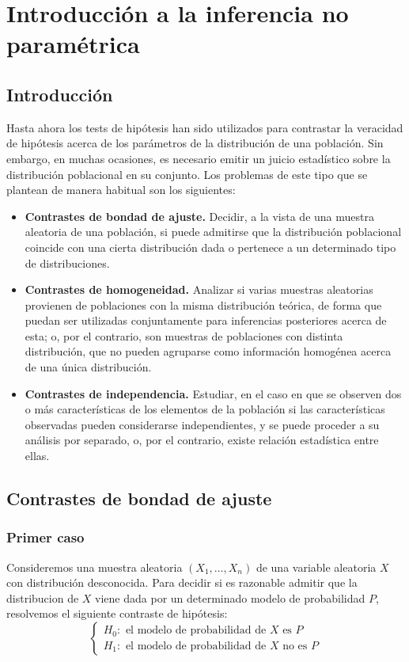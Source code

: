 \chapter{Introducción a la inferencia no paramétrica}
\section{Introducción}
Hasta ahora los tests de hipótesis han sido utilizados para contrastar la veracidad de hipótesis acerca de los parámetros de la distribución de una población.
Sin embargo, en muchas ocasiones, es necesario emitir un juicio estadístico sobre la distribución poblacional en su conjunto.
Los problemas de este tipo que se plantean de manera habitual son los siguientes:
\begin{itemize}
    \item \textbf{Contrastes de bondad de ajuste.}
          Decidir, a la vista de una muestra aleatoria de una población, si puede admitirse que la distribución poblacional coincide con una cierta distribución dada o pertenece a un determinado tipo de distribuciones.
    \item \textbf{Contrastes de homogeneidad.}
          Analizar si varias muestras aleatorias provienen de poblaciones con la misma distribución teórica, de forma que puedan ser utilizadas conjuntamente para inferencias posteriores acerca de esta; o, por el contrario, son muestras de poblaciones con distinta distribución, que no pueden agruparse como información homogénea acerca de una única distribución.
    \item \textbf{Contrastes de independencia.}
          Estudiar, en el caso en que se observen dos o más características de los elementos de la población si las características observadas pueden considerarse independientes, y se puede proceder a su análisis por separado, o, por el contrario, existe relación estadística entre ellas.
\end{itemize}

\section{Contrastes de bondad de ajuste}
\subsection*{Primer caso}
Consideremos una muestra aleatoria $(X_1, \dots, X_n)$ de una variable aleatoria $X$ con distribución desconocida.
Para decidir si es razonable admitir que la distribucion de $X$ viene dada por un determinado modelo de probabilidad $P$, resolvemos el siguiente contraste de hipótesis:
$$\begin{cases}
        H_0: \text{ el modelo de probabilidad de } X \text{ es } P \\
        H_1: \text{ el modelo de probabilidad de } X \text{ no es } P
    \end{cases}$$

